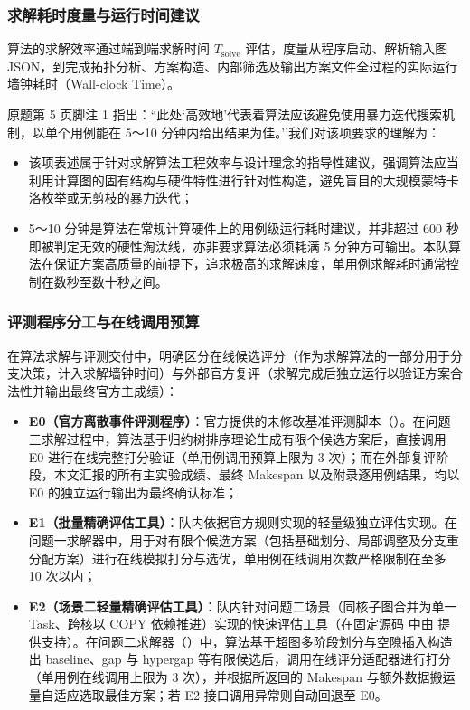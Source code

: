 \documentclass[anonymous,withtoc]{gmcm2026}
\providecommand{\tightlist}{\setlength{\itemsep}{0pt}\setlength{\parskip}{0pt}}
\begin{document}
\subsubsection{求解耗时度量与运行时间建议}

算法的求解效率通过端到端求解时间 \(T_{\text{solve}}\) 评估，度量从程序启动、解析输入图 JSON，到完成拓扑分析、方案构造、内部筛选及输出方案文件全过程的实际运行墙钟耗时（Wall-clock Time）。

原题第 5 页脚注 1 指出：``此处`高效地'代表着算法应该避免使用暴力迭代搜索机制，以单个用例能在 5～10 分钟内给出结果为佳。''我们对该项要求的理解为：

\begin{itemize}
\tightlist
\item
  该项表述属于针对求解算法工程效率与设计理念的指导性建议，强调算法应当利用计算图的固有结构与硬件特性进行针对性构造，避免盲目的大规模蒙特卡洛枚举或无剪枝的暴力迭代；
\item
  5～10 分钟是算法在常规计算硬件上的用例级运行耗时建议，并非超过 600 秒即被判定无效的硬性淘汰线，亦非要求算法必须耗满 5 分钟方可输出。本队算法在保证方案高质量的前提下，追求极高的求解速度，单用例求解耗时通常控制在数秒至数十秒之间。
\end{itemize}

\subsubsection{评测程序分工与在线调用预算}

在算法求解与评测交付中，明确区分在线候选评分（作为求解算法的一部分用于分支决策，计入求解墙钟时间）与外部官方复评（求解完成后独立运行以验证方案合法性并输出最终官方主成绩）：

\begin{itemize}
\tightlist
\item
  \textbf{E0（官方离散事件评测程序）}：官方提供的未修改基准评测脚本（\texttt{}）。在问题三求解过程中，算法基于归约树排序理论生成有限个候选方案后，直接调用 E0 进行在线完整打分验证（单用例调用预算上限为 3 次）；而在外部复评阶段，本文汇报的所有主实验成绩、最终 Makespan 以及附录逐用例结果，均以 E0 的独立运行输出为最终确认标准；
\item
  \textbf{E1（批量精确评估工具）}：队内依据官方规则实现的轻量级独立评估实现。在问题一求解器中，用于对有限个候选方案（包括基础划分、局部调整及分支重分配方案）进行在线模拟打分与选优，单用例在线调用次数严格限制在至多 10 次以内；
\item
  \textbf{E2（场景二轻量精确评估工具）}：队内针对问题二场景（同核子图合并为单一 Task、跨核以 COPY 依赖推进）实现的快速评估工具（在固定源码 \texttt{} 中由 \texttt{} 提供支持）。在问题二求解器（\texttt{}）中，算法基于超图多阶段划分与空隙插入构造出 baseline、gap 与 hypergap 等有限候选后，调用在线评分适配器进行打分（单用例在线调用上限为 3 次），并根据所返回的 Makespan 与额外数据搬运量自适应选取最佳方案；若 E2 接口调用异常则自动回退至 E0。
\end{itemize}
\end{document}
